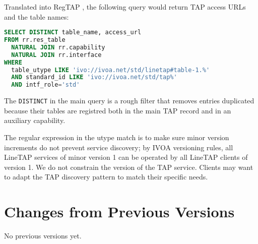 \documentclass[11pt,a4paper]{ivoa}
\begin{document}
Translated into RegTAP \citep{2019ivoa.spec.1011D}, the following query
would return TAP access URLs and the table names:

\begin{lstlisting}[language=SQL]
SELECT DISTINCT table_name, access_url
FROM rr.res_table
  NATURAL JOIN rr.capability
  NATURAL JOIN rr.interface
WHERE
  table_utype LIKE 'ivo://ivoa.net/std/linetap#table-1.%'
  AND standard_id LIKE 'ivo://ivoa.net/std/tap%'
  AND intf_role='std'
\end{lstlisting}

The \texttt{DISTINCT} in the main query is a rough filter that removes
entries duplicated because their tables are registred both in the main
TAP record and in an auxiliary capability.

The regular expression in the utype match is to make sure minor version
increments do not prevent service discovery; by IVOA versioning rules,
all LineTAP services of minor version 1 can be operated by all LineTAP
clients of version 1.  We do not constrain the version of the TAP
service. Clients may want to adapt the TAP discovery pattern to match
their specific needs.



\appendix
\section{Changes from Previous Versions}

No previous versions yet.



\end{document}
